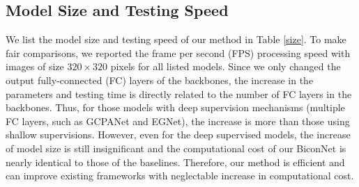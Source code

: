 \documentclass[review]{cvpr}
\begin{document}
\subsection{Model Size and Testing Speed}
We list the model size and testing speed of our method in Table \ref{size}. To make fair comparisons, we reported the frame per second (FPS) processing speed with images of size $320 \times 320$ pixels for all listed models. Since we only changed the output fully-connected (FC) layers of the backbones, the increase in the parameters and testing time is directly related to the number of FC layers in the backbones. Thus, for those models with deep supervision mechanisms (multiple FC layers, such as GCPANet and EGNet), the increase is more than those using shallow supervisions. However, even for the deep supervised models, the increase of model size is still insignificant and the computational cost of our BiconNet is nearly identical to those of the baselines. Therefore, our method is efficient and can improve existing frameworks with neglectable increase in computational cost. 

\begin{table}[h!]
\renewcommand\arraystretch{1.5}
\centering
{}
\end{table}
\end{document}
